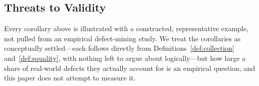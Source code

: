 \subsection{Threats to Validity}

Every corollary above is illustrated with a constructed, representative
example, not pulled from an empirical defect-mining study. We treat the
corollaries as conceptually settled---each follows directly from
Definitions~\ref{def:collection} and~\ref{def:equality}, with nothing left
to argue about logically---but how large a share of real-world defects
they actually account for is an empirical question, and this paper does
not attempt to measure it.